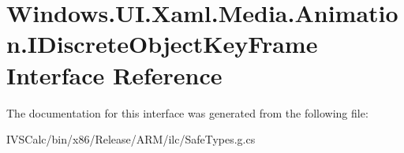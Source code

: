 \hypertarget{interface_windows_1_1_u_i_1_1_xaml_1_1_media_1_1_animation_1_1_i_discrete_object_key_frame}{}\section{Windows.\+U\+I.\+Xaml.\+Media.\+Animation.\+I\+Discrete\+Object\+Key\+Frame Interface Reference}
\label{interface_windows_1_1_u_i_1_1_xaml_1_1_media_1_1_animation_1_1_i_discrete_object_key_frame}


The documentation for this interface was generated from the following file\+:\begin{DoxyCompactItemize}
\item 
I\+V\+S\+Calc/bin/x86/\+Release/\+A\+R\+M/ilc/Safe\+Types.\+g.\+cs\end{DoxyCompactItemize}
